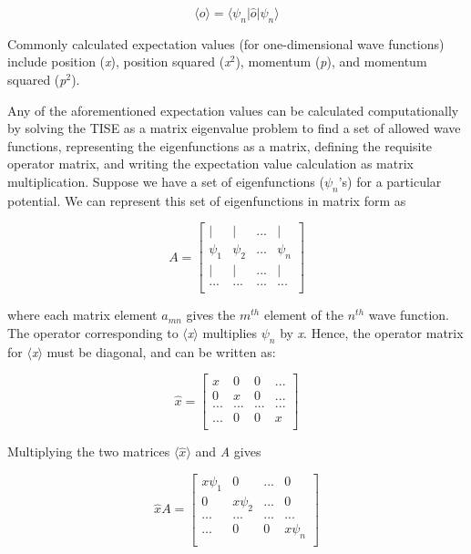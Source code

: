 \documentclass[%
 reprint,
 amsmath,amssymb,
 aps,
]{revtex4-1}
\begin{document}
\begin{equation}
\langle o \rangle = \langle \psi_n | \hat{o} | \psi_n \rangle
\end{equation}

Commonly calculated expectation values (for one-dimensional wave functions) include position (\textit{x}), position squared (\textit{x}$^2$), momentum (\textit{p}), and momentum squared (\textit{p}$^2$).

Any of the aforementioned expectation values can be calculated computationally by solving the TISE as a matrix eigenvalue problem to find a set of allowed wave functions, representing the eigenfunctions as a matrix, defining the requisite operator matrix, and writing the expectation value calculation as matrix multiplication.  Suppose we have a set of eigenfunctions ($\psi_n$'s) for a particular potential.  We can represent this set of eigenfunctions in matrix form as

\[
A = 
\begin{bmatrix}
| & | & ... & | \\
\psi_1 & \psi_2 & ... & \psi_n \\
| & | & ... & | \\
... & ... & ... & ... \\
\end{bmatrix}
\]

where each matrix element $a_{mn}$ gives the $m^{th}$ element of the $n^{th}$ wave function.
The operator corresponding to $\langle$\textit{x}$\rangle$ multiplies $\psi_n$ by \textit{x}.  Hence, the operator matrix for $\langle$\textit{x}$\rangle$ must be diagonal, and can be written as:

\[
\hat{x} = 
\begin{bmatrix}
x & 0 & 0 & ... \\
0 & x & 0 & ... \\
... & ... & ... & ... \\
... & 0 & 0 & x\\
\end{bmatrix}
\]

Multiplying the two matrices $\langle\hat{x}\rangle$ and \textit{A} gives

\[
\hat{x}A = 
\begin{bmatrix}
x\psi_1 & 0 & ... & 0 \\
0 & x\psi_2 & ... & 0 \\
... & ... & ... & ... \\
... & 0 & 0 & x\psi_n \\
\end{bmatrix}
\]
\end{document}
